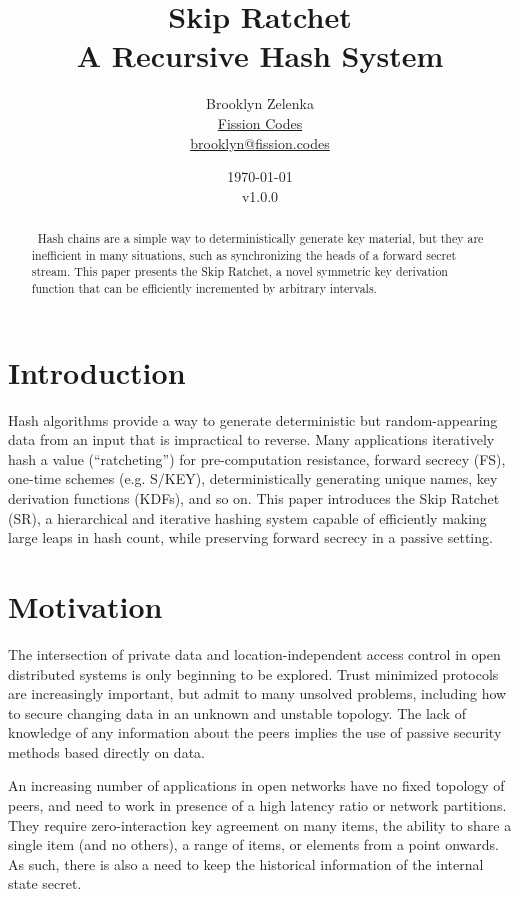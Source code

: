 \documentclass{article}
\title{Skip Ratchet \\[1ex] \large A Recursive Hash System}
\author{Brooklyn Zelenka \\ \href{https://fission.codes}{Fission Codes} \\ \href{mailto:brooklyn@fission.codes}{brooklyn@fission.codes} }
\date{\today\\v1.0.0}
\begin{document}
    \maketitle
    
   	\begin{abstract}\
   		Hash chains are a simple way to deterministically generate key material, but they are inefficient in many situations, such as synchronizing the heads of a forward secret stream. This paper presents the Skip Ratchet, a novel symmetric key derivation function that can be efficiently incremented by arbitrary intervals.
   	\end{abstract}

   	\section{Introduction}
   	
	Hash algorithms provide a way to generate deterministic but random-appearing data from an input that is impractical to reverse. Many applications iteratively hash a value (``ratcheting''\cite{pond}) for pre-computation resistance, forward secrecy (FS), one-time schemes (e.g. S/KEY\cite{rfc1760}), deterministically generating unique names, key derivation functions (KDFs), and so on. This paper introduces the Skip Ratchet (SR), a hierarchical and iterative hashing system capable of efficiently making large leaps in hash count, while preserving forward secrecy in a passive setting.

    \section{Motivation}
    
    The intersection of private data and location-independent access control in open distributed systems is only beginning to be explored. Trust minimized protocols are increasingly important, but admit to many unsolved problems, including how to secure changing data in an unknown and unstable topology. The lack of knowledge of any information about the peers implies the use of passive security methods based directly on data.
    
    An increasing number of applications in open networks have no fixed topology of peers, and need to work in presence of a high latency ratio or network partitions. They require zero-interaction key agreement on many items, the ability to share a single item (and no others), a range of items, or elements from a point onwards. As such, there is also a need to keep the historical information of the internal state secret.
    
\end{document}
